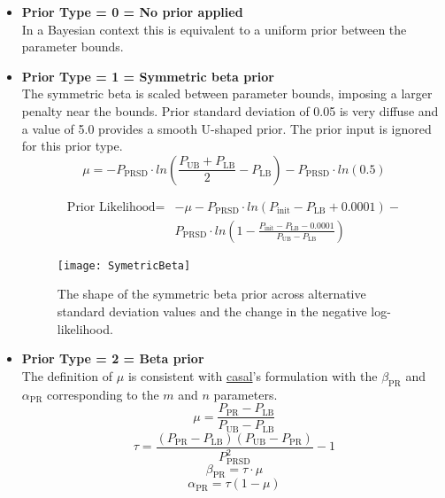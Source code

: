 \begin{itemize}
	\item  \textbf{Prior Type = 0 = No prior applied} \\ 
	In a Bayesian context this is equivalent to a uniform prior between the parameter bounds.
	
	\item  \textbf{Prior Type = 1 = Symmetric beta prior} \\ 
	The symmetric beta is scaled between parameter bounds, imposing a larger penalty near the bounds. Prior standard deviation of 0.05 is very diffuse and a value of 5.0 provides a smooth U-shaped prior. The prior input is ignored for this prior type.
	\begin{equation} 
		\mu = -P_\text{PRSD} \cdot ln\left(\frac{P_\text{UB}+P_\text{LB}}{2} - P_\text{LB} \right) - P_\text{PRSD} \cdot ln(0.5)
	\end{equation}
	
	\begin{equation}
		\begin{split}
\text{Prior Likelihood} = &-\mu -P_\text{PRSD} \cdot ln\left(P_\text{init}-P_\text{LB}+0.0001\right) - \\
& P_\text{PRSD} \cdot ln\left(1-\frac{P_\text{init}-P_\text{LB}-0.0001}{P_\text{UB}-P_\text{LB}}\right)
		\end{split}
	\end{equation}

	\begin{figure}[ht]
		\begin{center}
			\texttt{[image: SymetricBeta]}\\
		\end{center}
		\caption{The shape of the symmetric beta prior across alternative standard deviation values and the change in the negative log-likelihood.}
	\end{figure}	

	
	\item \textbf{Prior Type = 2 = Beta prior} \\ 
	The definition of $\mu$ is consistent with \href{https://casal2.github.io/}{\gls{casal}}'s formulation with the $\beta_\text{PR}$ and $\alpha_\text{PR}$ corresponding to the $m$ and $n$ parameters.
	\begin{equation}
		\mu = \frac{P_\text{PR}-P_\text{LB}}{P_\text{UB}-P_\text{LB}} 
	\end{equation}
	\begin{equation}
		\tau  = \frac{(P_\text{PR}-P_\text{LB})(P_\text{UB}-P_\text{PR})}{P_\text{PRSD}^2}-1
	\end{equation}
	\begin{equation}
		\beta_\text{PR}  = \tau \cdot \mu
	\end{equation}
	\begin{equation}
		\alpha_\text{PR} = \tau (1-\mu)
	\end{equation}
	

\end{itemize}
